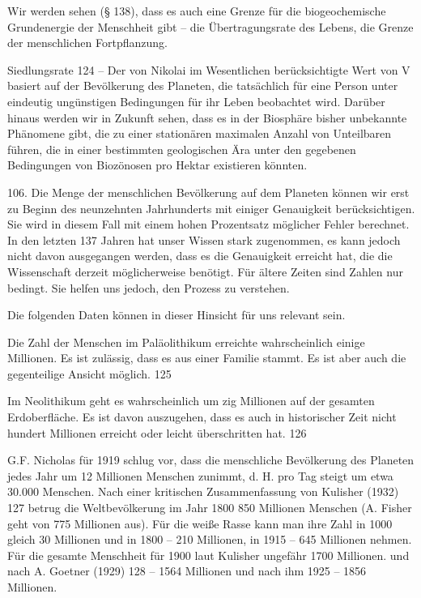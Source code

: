 \documentclass[11pt,a4paper]{book}
\begin{document}
Wir werden sehen (§ 138), dass es auch eine Grenze für die biogeochemische Grundenergie der Menschheit gibt -- die Übertragungsrate des Lebens, die Grenze der menschlichen Fortpflanzung.



Siedlungsrate 124 -- Der von Nikolai im Wesentlichen berücksichtigte Wert von V basiert auf der Bevölkerung des Planeten, die tatsächlich für eine Person unter eindeutig ungünstigen Bedingungen für ihr Leben beobachtet wird. Darüber hinaus werden wir in Zukunft sehen, dass es in der Biosphäre bisher unbekannte Phänomene gibt, die zu einer stationären maximalen Anzahl von Unteilbaren führen, die in einer bestimmten geologischen Ära unter den gegebenen Bedingungen von Biozönosen pro Hektar existieren könnten.



106. Die Menge der menschlichen Bevölkerung auf dem Planeten können wir erst zu Beginn des neunzehnten Jahrhunderts mit einiger Genauigkeit berücksichtigen. Sie wird in diesem Fall mit einem hohen Prozentsatz möglicher Fehler berechnet. In den letzten 137 Jahren hat unser Wissen stark zugenommen, es kann jedoch nicht davon ausgegangen werden, dass es die Genauigkeit erreicht hat, die die Wissenschaft derzeit möglicherweise benötigt. Für ältere Zeiten sind Zahlen nur bedingt. Sie helfen uns jedoch, den Prozess zu verstehen.



Die folgenden Daten können in dieser Hinsicht für uns relevant sein.



Die Zahl der Menschen im Paläolithikum erreichte wahrscheinlich einige Millionen. Es ist zulässig, dass es aus einer Familie stammt. Es ist aber auch die gegenteilige Ansicht möglich. 125



Im Neolithikum geht es wahrscheinlich um zig Millionen auf der gesamten Erdoberfläche. Es ist davon auszugehen, dass es auch in historischer Zeit nicht hundert Millionen erreicht oder leicht überschritten hat. 126



G.F. Nicholas für 1919 schlug vor, dass die menschliche Bevölkerung des Planeten jedes Jahr um 12 Millionen Menschen zunimmt, d. H. pro Tag steigt um etwa 30.000 Menschen. Nach einer kritischen Zusammenfassung von Kulisher (1932) 127 betrug die Weltbevölkerung im Jahr 1800 850 Millionen Menschen (A. Fisher geht von 775 Millionen aus). Für die weiße Rasse kann man ihre Zahl in 1000 gleich 30 Millionen und in 1800 -- 210 Millionen, in 1915 -- 645 Millionen nehmen. Für die gesamte Menschheit für 1900 laut Kulisher ungefähr 1700 Millionen. und nach A. Goetner (1929) 128 -- 1564 Millionen und nach ihm 1925 -- 1856 Millionen.
\end{document}
